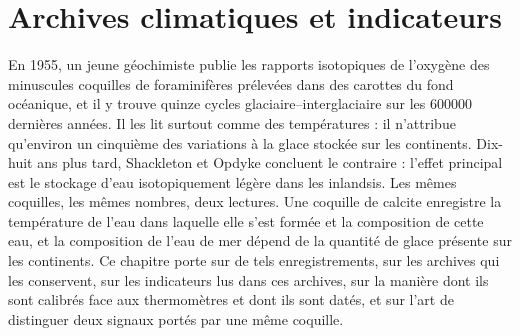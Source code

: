 \chapter{Archives climatiques et indicateurs}\label{ch:b2:climate-proxies}

En 1955, un jeune géochimiste publie les rapports isotopiques de l'oxygène des minuscules coquilles de
foraminifères prélevées dans des carottes du fond océanique, et il y trouve quinze cycles glaciaire--interglaciaire
sur les \num{600000} dernières années. Il les lit surtout comme des températures : il n'attribue qu'environ un
cinquième des variations à la glace stockée sur les continents. Dix-huit ans plus tard, Shackleton et Opdyke
concluent le contraire : l'effet principal est le stockage d'eau isotopiquement légère dans les inlandsis. Les mêmes
coquilles, les mêmes nombres, deux lectures. Une coquille de calcite enregistre la température de l'eau dans
laquelle elle s'est formée et la composition de cette eau, et la composition de l'eau de mer dépend de la quantité
de glace présente sur les continents. Ce chapitre porte sur de tels enregistrements, sur les archives qui les conservent,
sur les indicateurs lus dans ces archives, sur la manière dont ils sont calibrés face aux thermomètres et dont ils sont
datés, et sur l'art de distinguer deux signaux portés par une même coquille.

